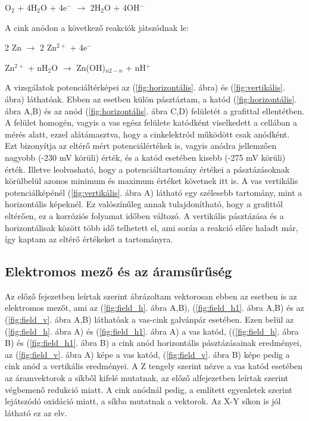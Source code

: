 O$_2$ + 4H$_2$O + 4e$^-$ $\longrightarrow$ 2H$_2$O + 4OH$^-$

A cink anódon a következő reakciók játszódnak le:

2 Zn $\longrightarrow$ 2 Zn$^{2+}$ + 4e$^-$ 

Zn$^{2+}$ + nH$_2$O $\longrightarrow$ Zn(OH)$_{n2-n}$ + nH$^+$

A vizsgálatok potenciáltérképei az (\ref{fig:horizontális}. ábra) és (\ref{fig:vertikális}. ábra) láthatóak. Ebben az esetben külön pásztáztam, a katód (\ref{fig:horizontális}. ábra A,B) és az anód (\ref{fig:horizontális}. ábra C,D) felületét a grafittal ellentétben. A felület homogén, vagyis a vas egész felülete katódként viselkedett a cellában a mérés alatt, ezzel alátámasztva, hogy a cinkelektród működött csak anódként. Ezt bizonyítja az eltérő mért potenciálértékek is, vagyis anódra jellemzően nagyobb (-230 mV körüli) érték, és a katód esetében kisebb (-275 mV körüli) érték. Illetve leolvasható, hogy a potenciáltartomány értékei a pásztázásoknak körülbelül azonos minimum és maximum értéket követnek itt is. A vas vertikális potenciálképénél (\ref{fig:vertikális}. ábra A) látható egy szélesebb tartomány, mint a horizontális képeknél. Ez valószínűleg annak tulajdonítható, hogy a grafittól eltérően, ez a korróziós folyamat időben változó. A vertikális pásztázása és a horizontálisak között több idő telhetett el, ami során a reakció előre haladt már, így kaptam az eltérő értékeket a tartományra. 

\subsection{Elektromos mező és az áramsűrűség}

Az előző fejezetben leírtak szerint ábrázoltam vektorosan ebben az esetben is az elektromos mezőt, ami az (\ref{fig:field_h}. ábra A,B), (\ref{fig:field_h1}. ábra A,B) és az (\ref{fig:field_v}. ábra A,B) láthatóak a vas-cink galvánpár esetében. Ezen belül az (\ref{fig:field_h}. ábra A) és (\ref{fig:field_h1}. ábra A) a vas katód, ((\ref{fig:field_h}. ábra B) és (\ref{fig:field_h1}. ábra B) a cink anód horizontális pásztázásainak eredményei, az (\ref{fig:field_v}. ábra A) képe a vas katód, (\ref{fig:field_v}. ábra B) képe pedig a cink anód a vertikális eredményei. A Z tengely szerint nézve a vas katód esetében az áramvektorok a síkből kifelé mutatnak, az előző alfejezetben leírtak szerint végbemenő redukció miatt. A cink anódnál pedig, a említett egyenletek szerint lejátszódó oxidáció miatt, a síkba mutatnak a vektorok. Az X-Y síkon is jól látható ez az elv.

